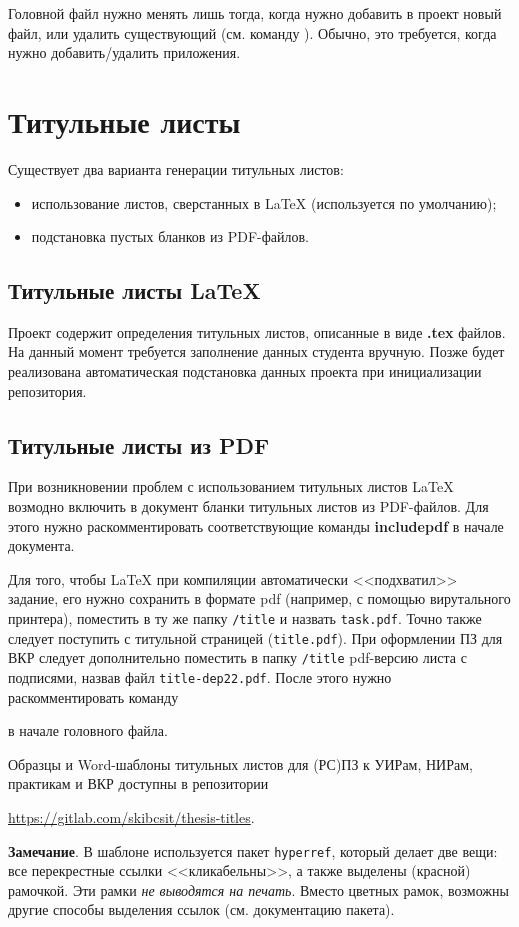 Головной файл нужно менять лишь тогда, когда нужно добавить в проект новый файл,
или удалить существующий (см. команду \verb||). Обычно, это требуется,
когда нужно добавить/удалить приложения.

\section{Титульные листы}

Существует два варианта генерации титульных листов:

\begin{itemize}
  \item использование листов, сверстанных в \LaTeX{} (используется по
  умолчанию);
  \item подстановка пустых бланков из PDF-файлов.
\end{itemize}

\subsection{Титульные листы LaTeX}

Проект содержит определения титульных листов, описанные в виде \textbf{.tex}
файлов. На данный момент требуется заполнение данных студента вручную. Позже
будет реализована автоматическая подстановка данных проекта при инициализации
репозитория.

\subsection{Титульные листы из PDF}

При возникновении проблем с использованием титульных листов \LaTeX{} возмодно
включить в документ бланки титульных листов из PDF-файлов. Для этого нужно
раскомментировать соответствующие команды \textbf{includepdf} в начале
документа.

Для того, чтобы \LaTeX{} при компиляции автоматически <<подхватил>> задание, его
нужно сохранить в формате pdf (например, с помощью вирутального принтера),
поместить в ту же папку \texttt{/title} и назвать \texttt{task.pdf}. Точно также
следует поступить с титульной страницей (\texttt{title.pdf}). При оформлении ПЗ
для ВКР следует дополнительно поместить в папку \texttt{/title} pdf-версию листа
с подписями, назвав файл \texttt{title-dep22.pdf}. После этого нужно
раскомментировать команду
\begin{center}
  \verb||
\end{center}
в начале головного файла.

Образцы и Word-шаблоны титульных листов для (РС)ПЗ к УИРам, НИРам, практикам и
ВКР доступны в репозитории
\begin{center}
  \url{https://gitlab.com/skibcsit/thesis-titles}.
\end{center}  

\textbf{Замечание}. В шаблоне используется пакет \texttt{hyperref}, который
делает две вещи: все перекрестные ссылки <<кликабельны>>, а также выделены
(красной) рамочкой. Эти рамки \textit{не выводятся на печать}. Вместо цветных
рамок, возможны другие способы выделения ссылок (см. документацию пакета).
